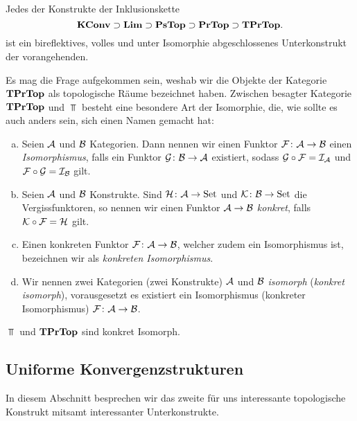 \begin{prop}
  \label{prop:inklusion}
  Jedes der Konstrukte der Inklusionskette
  $$
  \mathbf{KConv} \supset \mathbf{Lim} \supset \mathbf{PsTop} \supset \mathbf{PrTop} \supset \mathbf{TPrTop}.
  $$
  ist ein bireflektives, volles und unter Isomorphie abgeschlossenes Unterkonstrukt der vorangehenden.
\end{prop}

Es mag die Frage aufgekommen sein, weshab wir die Objekte der Kategorie $\mathbf{TPrTop}$ als topologische Räume bezeichnet haben.
Zwischen besagter Kategorie $\mathbf{TPrTop}$ und $\Top$ besteht eine besondere Art der Isomorphie, die, wie sollte es auch anders sein, sich einen Namen gemacht hat:
\begin{defn}
  \begin{enumerate}[a)]
    \item Seien $\mathcal{A}$ und $\mathcal{B}$ Kategorien.
      Dann nennen wir einen Funktor $\mathcal{F} \colon \mathcal{A} \to \mathcal{B}$ einen \emph{Isomorphismus}, falls ein Funktor $\mathcal{G} \colon \mathcal{B} \to \mathcal{A}$ existiert, sodass $\mathcal{G} \circ \mathcal{F} = \mathcal{I}_{\mathcal{A}}$ und $\mathcal{F} \circ \mathcal{G} = \mathcal{I}_{\mathcal{B}}$ gilt.
    \item Seien $\mathcal{A}$ und $\mathcal{B}$ Konstrukte.
      Sind $\mathcal{H} \colon \mathcal{A} \to \mathrm{Set}$ und $\mathcal{K} \colon \mathcal{B} \to \mathrm{Set}$ die Vergissfunktoren, so nennen wir einen Funktor $\mathcal{A} \to \mathcal{B}$ \emph{konkret}, falls $\mathcal{K} \circ \mathcal{F} = \mathcal{H}$ gilt.
    \item Einen konkreten Funktor $\mathcal{F} \colon \mathcal{A} \to \mathcal{B}$, welcher zudem ein Isomorphismus ist, bezeichnen wir als \emph{konkreten Isomorphismus}.
    \item Wir nennen zwei Kategorien (zwei Konstrukte) $\mathcal{A}$ und $\mathcal{B}$ \emph{isomorph} (\emph{konkret isomorph}), vorausgesetzt es existiert ein Isomorphismus (konkreter Isomorphismus) $\mathcal{F} \colon \mathcal{A} \to \mathcal{B}$.
  \end{enumerate}
\end{defn}

\begin{prop}
  $\Top$ und $\mathbf{TPrTop}$ sind konkret Isomorph.
\end{prop}


\subsection{Uniforme Konvergenzstrukturen}

In diesem Abschnitt besprechen wir das zweite für uns interessante topologische Konstrukt mitsamt interessanter Unterkonstrukte.

